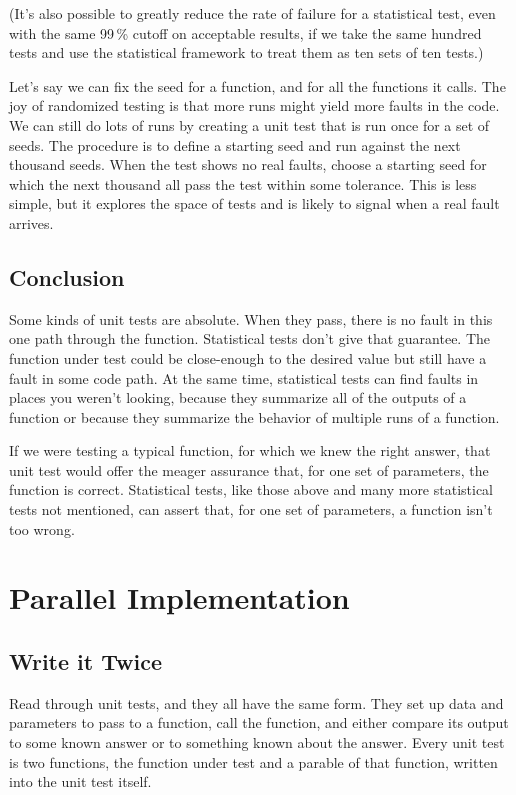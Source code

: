 \documentclass[fleqn,10pt]{olplainarticle}
\begin{document}
(It's also possible to greatly reduce the rate of failure
for a statistical test, even with the same 99\,\% cutoff
on acceptable results, if we take the same hundred tests
and use the statistical framework to treat them as ten sets
of ten tests.)

Let's say we can fix the seed for a function, and for all the
functions it calls. The joy of randomized testing is that more
runs might yield more faults in the code. We
can still do lots of runs by creating a unit test that is run once
for a set of seeds.  The procedure is to define a starting seed and run against
the next thousand seeds. When the test shows no real faults,
choose a starting seed for which the next thousand all pass
the test within some tolerance. This is less simple, but it
explores the space of tests and is likely to signal when
a real fault arrives.

\subsection{Conclusion}

Some kinds of unit tests are absolute. When they pass,
there is no fault in this one path through the function.
Statistical tests don't give that guarantee. The function
under test could be close-enough to the desired value but
still have a fault in some code path.
At the same time, statistical tests can find faults
in places you weren't looking, because they summarize all
of the outputs of a function or because they summarize
the behavior of multiple runs of a function.

If we were testing a typical function, for which we knew the
right answer, that unit test would offer the meager assurance that,
for one set of parameters, the function is correct.
Statistical tests, like those above and many more statistical
tests not mentioned, can assert that, for one set of parameters,
a function isn't too wrong.


\section{Parallel Implementation}\label{sec:parallel-implementation}
\subsection{Write it Twice}\label{sec:parallel-twice}
Read through unit tests, and they all have the same form.
They set up data and parameters to pass to a function, call the
function, and either compare its output to some known answer or to
something known about the answer. Every unit test is two
functions, the function under test and a parable
of that function, written into the unit test itself.
\end{document}

